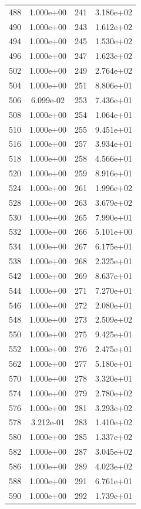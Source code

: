 \documentclass[12pt]{article}
\begin{document}
\begin{longtable}{@{}cccc@{}}
488 & 1.000e+00 & 241 & 3.186e+02 \\
490 & 1.000e+00 & 243 & 1.612e+02 \\
494 & 1.000e+00 & 245 & 1.530e+02 \\
496 & 1.000e+00 & 247 & 1.623e+02 \\
502 & 1.000e+00 & 249 & 2.764e+02 \\
504 & 1.000e+00 & 251 & 8.806e+01 \\
506 & 6.099e-02 & 253 & 7.436e+01 \\
508 & 1.000e+00 & 254 & 1.064e+01 \\
510 & 1.000e+00 & 255 & 9.451e+01 \\
516 & 1.000e+00 & 257 & 3.934e+01 \\
518 & 1.000e+00 & 258 & 4.566e+01 \\
520 & 1.000e+00 & 259 & 8.916e+01 \\
524 & 1.000e+00 & 261 & 1.996e+02 \\
528 & 1.000e+00 & 263 & 3.679e+02 \\
530 & 1.000e+00 & 265 & 7.990e+01 \\
532 & 1.000e+00 & 266 & 5.101e+00 \\
534 & 1.000e+00 & 267 & 6.175e+01 \\
538 & 1.000e+00 & 268 & 2.325e+01 \\
542 & 1.000e+00 & 269 & 8.637e+01 \\
544 & 1.000e+00 & 271 & 7.270e+01 \\
546 & 1.000e+00 & 272 & 2.080e+01 \\
548 & 1.000e+00 & 273 & 2.509e+02 \\
550 & 1.000e+00 & 275 & 9.425e+01 \\
552 & 1.000e+00 & 276 & 2.475e+01 \\
562 & 1.000e+00 & 277 & 5.180e+01 \\
570 & 1.000e+00 & 278 & 3.320e+01 \\
574 & 1.000e+00 & 279 & 2.780e+02 \\
576 & 1.000e+00 & 281 & 3.293e+02 \\
578 & 3.212e-01 & 283 & 1.410e+02 \\
580 & 1.000e+00 & 285 & 1.337e+02 \\
582 & 1.000e+00 & 287 & 3.045e+02 \\
586 & 1.000e+00 & 289 & 4.023e+02 \\
588 & 1.000e+00 & 291 & 6.761e+01 \\
590 & 1.000e+00 & 292 & 1.739e+01 \\

\end{longtable}
\end{document}
